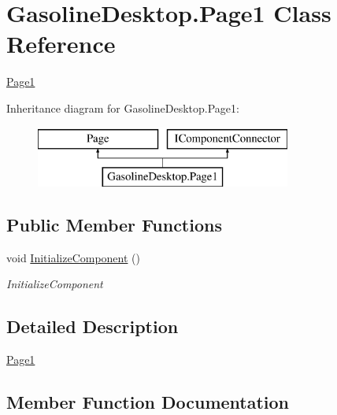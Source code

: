 \hypertarget{class_gasoline_desktop_1_1_page1}{}\section{Gasoline\+Desktop.\+Page1 Class Reference}
\label{class_gasoline_desktop_1_1_page1}


\mbox{\hyperlink{class_gasoline_desktop_1_1_page1}{Page1}}  


Inheritance diagram for Gasoline\+Desktop.\+Page1\+:\begin{figure}[H]
\begin{center}
\leavevmode
\includegraphics[height=2.000000cm]{class_gasoline_desktop_1_1_page1}
\end{center}
\end{figure}
\subsection*{Public Member Functions}
\begin{DoxyCompactItemize}
\item 
void \mbox{\hyperlink{class_gasoline_desktop_1_1_page1_acc8a3bdb3928e6f8dbddef846b11a209}{Initialize\+Component}} ()
\begin{DoxyCompactList}\small\item\em Initialize\+Component \end{DoxyCompactList}\end{DoxyCompactItemize}


\subsection{Detailed Description}
\mbox{\hyperlink{class_gasoline_desktop_1_1_page1}{Page1}} 



\subsection{Member Function Documentation}
\mbox{\label{class_gasoline_desktop_1_1_page1_acc8a3bdb3928e6f8dbddef846b11a209}} 
